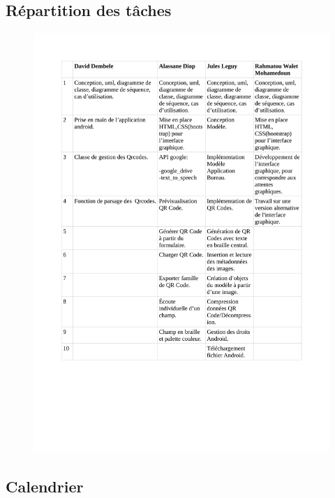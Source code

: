 \subsection{Répartition des tâches}

\begin{figure}[!h]
	\centering
   \includegraphics[scale=0.25]{img/taches.png}
\end{figure}


\subsection{Calendrier}

